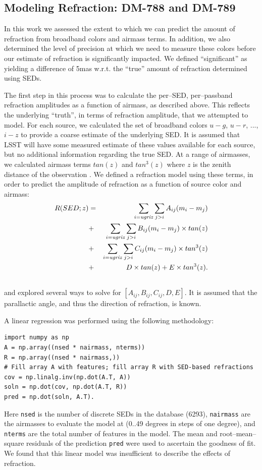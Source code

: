 \documentclass[DM,toc]{lsstdoc}
\begin{document}
\subsection{\bf Modeling Refraction: DM-788 and DM-789}

In this work we assessed the extent to which we can predict the amount
of refraction from broadband colors and airmass terms.  In addition,
we also determined the level of precision at which we need to measure
these colors before our estimate of refraction is significantly
impacted.  We defined ``significant'' as yielding a difference of 5mas
w.r.t. the ``true'' amount of refraction determined using SEDs.

The first step in this process was to calculate the per--SED,
per--passband refraction amplitudes as a function of airmass, as
described above.  This reflects the underlying ``truth'', in terms of
refraction amplitude, that we attempted to model.  For each source, we
calculated the set of broadband colors $u-g$, $u-r$, ..., $i-z$ to
provide a coarse estimate of the underlying SED.  It is assumed that
LSST will have some measured estimate of these values available for
each source, but no additional information regarding the true SED.  At
a range of airmasses, we calculated airmass terms $tan(z)$ and
$tan^3(z)$ where $z$ is the zenith distance of the observation
\citep[e.g.][]{1996PASP..108.1051S}.  We defined a refraction model
using these terms, in order to predict the amplitude of refraction as
a function of source color and airmass:
\begin{eqnarray}
  R(SED;z) & = & \sum_{i={\it ugriz}}\sum_{j>i} A_{ij} (m_i - m_j)        \\ \nonumber
  & + & \sum_{i={\it ugriz}}\sum_{j>i} B_{ij} (m_i - m_j) \times tan(z)   \\ \nonumber
  & + & \sum_{i={\it ugriz}}\sum_{j>i} C_{ij} (m_i - m_j) \times tan^3(z) \\ \nonumber
  & + & D \times tan(z) + E \times tan^3(z).                              \\ \nonumber
\end{eqnarray}
and explored several ways to solve for $[A_{ij},B_{ij},C_{ij},D,E]$.
It is assumed that the parallactic angle, and thus the direction of
refraction, is known.

A linear regression was performed using the following methodology:
\begin{Verbatim}[frame=single]
import numpy as np
A = np.array((nsed * nairmass, nterms))
R = np.array((nsed * nairmass,))
# Fill array A with features; fill array R with SED-based refractions
cov = np.linalg.inv(np.dot(A.T, A))
soln = np.dot(cov, np.dot(A.T, R))
pred = np.dot(soln, A.T).
\end{Verbatim}
Here {\tt nsed} is the number of discrete SEDs in the database (6293),
{\tt nairmass} are the airmasses to evaluate the model at (0..49
degrees in steps of one degree), and {\tt nterms} are the total number
of features in the model.  The mean and root--mean--square residuals
of the prediction {\tt pred} were used to ascertain the goodness of
fit.  We found that this linear model was insufficient to describe the
effects of refraction.
\end{document}
